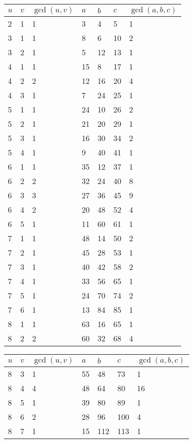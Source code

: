 \documentclass[letterpaper, 12pt]{memoir}
\theoremstyle{mystyle}
\begin{document}
\begin{centering}
\begin{tabular}{|l l l|l l l l |}
    \hline
    $u$ & $v$ & $\gcd (u, v)$  & $a$   & $b$   & $c$ & $\gcd(a,b,c)$  \\
    \hline
    2 & 1 & 1 & 3 & 4 & 5 & 1 \\
    3 & 1 & 1 & 8 & 6 & 10 & 2 \\
    3 & 2 & 1 & 5 & 12 & 13 & 1 \\
    4 & 1 & 1 & 15 & 8 & 17 & 1 \\
    4 & 2 & 2 & 12 & 16 & 20 & 4 \\
    4 & 3 & 1 & 7 & 24 & 25 & 1 \\
    5 & 1 & 1 & 24 & 10 & 26 & 2 \\
    5 & 2 & 1 & 21 & 20 & 29 & 1 \\
    5 & 3 & 1 & 16 & 30 & 34 & 2 \\
    5 & 4 & 1 & 9 & 40 & 41 & 1 \\
    6 & 1 & 1 & 35 & 12 & 37 & 1 \\
    6 & 2 & 2 & 32 & 24 & 40 & 8 \\
    6 & 3 & 3 & 27 & 36 & 45 & 9 \\
    6 & 4 & 2 & 20 & 48 & 52 & 4 \\
    6 & 5 & 1 & 11 & 60 & 61 & 1 \\
    7 & 1 & 1 & 48 & 14 & 50 & 2 \\
    7 & 2 & 1 & 45 & 28 & 53 & 1 \\
    7 & 3 & 1 & 40 & 42 & 58 & 2 \\
    7 & 4 & 1 & 33 & 56 & 65 & 1 \\
    7 & 5 & 1 & 24 & 70 & 74 & 2 \\
    7 & 6 & 1 & 13 & 84 & 85 & 1 \\
    8 & 1 & 1 & 63 & 16 & 65 & 1 \\
    8 & 2 & 2 & 60 & 32 & 68 & 4 \\
    \hline
\end{tabular}
\quad    
\begin{tabular}{|l l l|l l l l |}
    \hline
    $u$ & $v$ & $\gcd (u, v)$  & $a$   & $b$   & $c$ & $\gcd(a,b,c)$  \\
    \hline
    8 & 3 & 1 & 55 & 48 & 73 & 1 \\
    8 & 4 & 4 & 48 & 64 & 80 & 16 \\
    8 & 5 & 1 & 39 & 80 & 89 & 1 \\
    8 & 6 & 2 & 28 & 96 & 100 & 4 \\
    8 & 7 & 1 & 15 & 112 & 113 & 1 \\

\end{tabular}
\end{centering}
\end{document}
